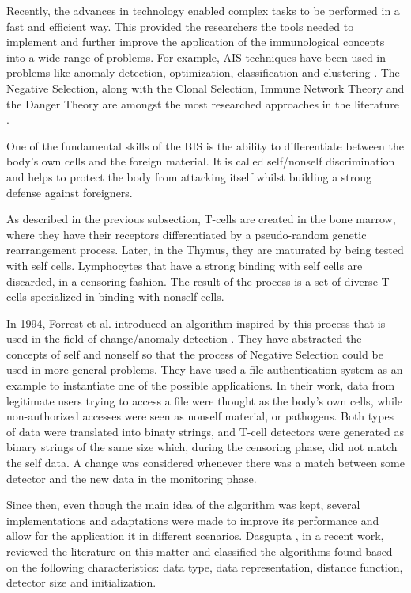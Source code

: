 Recently, the advances in technology enabled complex tasks to be performed in a fast and efficient way. This provided the researchers the tools needed to implement and further improve the application of the immunological concepts into a wide range of problems. For example, AIS techniques have been used in problems like anomaly detection, optimization, classification and clustering \cite{AISSOA2015}. The Negative Selection, along with the Clonal Selection, Immune Network Theory and the Danger Theory are amongst the most researched approaches in the literature \cite{NSAResearch2021}.

One of the fundamental skills of the BIS is the ability to differentiate between the body's own cells and the foreign material. It is called self/nonself discrimination \cite{NSAResearch2021} and helps to protect the body from attacking itself whilst building a strong defense against foreigners. 

As described in the previous subsection, T-cells are created in the bone marrow, where they have their receptors differentiated by a pseudo-random genetic rearrangement process. Later, in the Thymus, they are maturated by being tested with self cells. Lymphocytes that have a strong binding with self cells are discarded, in a censoring fashion. The result of the process is a set of diverse T cells specialized in binding with nonself cells.

In 1994, Forrest et al. introduced an algorithm inspired by this process that is used in the field of change/anomaly detection \cite{Forrest1994}. They have abstracted the concepts of self and nonself so that the process of Negative Selection could be used in more general problems. They have used a file authentication system as an example to instantiate one of the possible applications. In their work, data from legitimate users trying to access a file were thought as the body's own cells, while non-authorized accesses were seen as nonself material, or pathogens. Both types of data were translated into binaty strings, and T-cell detectors were generated as binary strings of the same size which, during the censoring phase, did not match the self data. A change was considered whenever there was a match between some detector and the new data in the monitoring phase.

Since then, even though the main idea of the algorithm was kept, several implementations and adaptations were made to improve its performance and allow for the application it in different scenarios. Dasgupta \cite{NSAResearch2021}, in a recent work, reviewed the literature on this matter and classified the algorithms found based on the following characteristics: data type, data representation, distance function, detector size and initialization.

